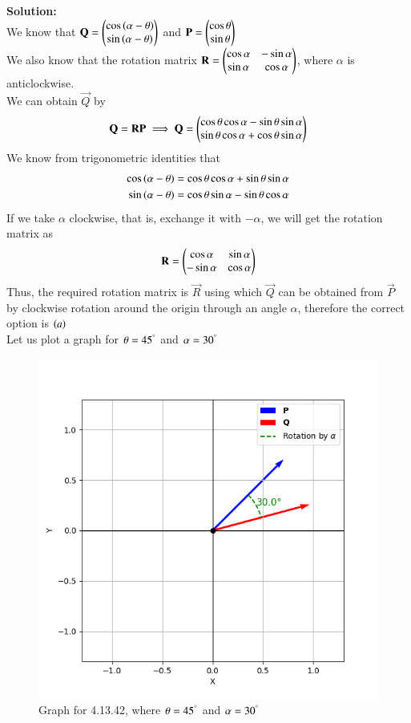 \documentclass[journal,12pt,onecolumn]{IEEEtran}
\theoremstyle{remark}
\begin{document}
\textbf{Solution:}
\vspace{1mm}
\\
We know that $\mathbf{Q}=\begin{pmatrix}\cos{\ensuremath{\left(\alpha - \theta\right)}} \\ \sin{\ensuremath{\left(\alpha - \theta\right)}}\end{pmatrix}$ and $\mathbf{P}=\begin{pmatrix}\cos{\theta}\\ \sin{\theta}\end{pmatrix}$\\
We also know that the rotation matrix $\mathbf{R}=\begin{pmatrix}\cos\alpha & -\sin\alpha \\ \sin{\alpha} & \cos\alpha\end{pmatrix}$, where $\alpha$ is anticlockwise.
\\ We can obtain $\vec{Q}$ by
\begin{align}
    \mathbf{Q}=\mathbf{R}\mathbf{P} \implies \mathbf{Q}=\begin{pmatrix}\cos\theta\cos\alpha - \sin\theta\sin\alpha \\ \sin\theta\cos\alpha +\cos\theta\sin\alpha   \end{pmatrix} 
\end{align}
We know from trigonometric identities that
\begin{align}
    \cos{\ensuremath{\left(\alpha-\theta\right)}}=\cos\theta\cos\alpha + \sin\theta\sin\alpha \\\sin{\ensuremath{\left(\alpha-\theta\right)}}=\cos\theta\sin\alpha - \sin\theta\cos\alpha
\end{align}
If we take $\alpha$ clockwise, that is, exchange it with $-\alpha$, we will get the rotation matrix as 
\begin{align}
    \mathbf{R}=\begin{pmatrix}\cos\alpha & \sin\alpha \\ -\sin{\alpha} & \cos\alpha\end{pmatrix}
\end{align}
Thus, the required rotation matrix is $\vec{R}$ using which $\vec{Q}$ can be obtained from $\vec{P}$ by clockwise rotation around the origin through an angle $\alpha $, therefore the correct option is $\left(a\right)$\\ 
\vspace{1mm}
Let us plot a graph for $\theta=45^{\degree}$ and $\alpha=30^{\degree}$
\begin{figure}[H]
    \centering
    \includegraphics[width=1\columnwidth]{figs/1.png}
    \caption{Graph for 4.13.42, where $\theta=45^{\degree}$ and $\alpha=30^{\degree}$}
    \label{fig:placeholder}
\end{figure}
\end{document}

